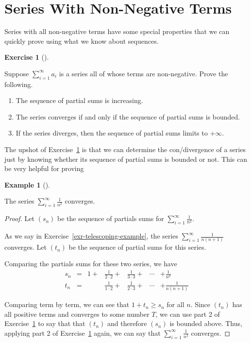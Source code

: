 \documentclass[
  letterpaper,
  DIV=11,
  numbers=noendperiod]{scrreprt}
\providecommand{\tightlist}{%
  \setlength{\itemsep}{0pt}\setlength{\parskip}{0pt}}
\theoremstyle{plain}
\theoremstyle{definition}
\newtheorem{exercise}{Exercise}[chapter]
\theoremstyle{plain}
\theoremstyle{plain}
\theoremstyle{definition}
\newtheorem{example}{Example}[chapter]
\theoremstyle{definition}
\theoremstyle{remark}
\begin{document}
\section{Series With Non-Negative
Terms}\label{series-with-non-negative-terms}

Series with all non-negative terms have some special properties that we
can quickly prove using what we know about sequences.

\begin{exercise}[]\protect\hypertarget{exr-positive-terms}{}\label{exr-positive-terms}

Suppose \(\displaystyle \sum_{i=1}^\infty a_i\) is a series all of whose
terms are non-negative. Prove the following.

\begin{enumerate}
\def\labelenumi{\arabic{enumi}.}
\tightlist
\item
  The sequence of partial sums is increasing.
\item
  The series converges if and only if the sequence of partial sums is
  bounded.
\item
  If the series diverges, then the sequence of partial sums limits to
  \(+\infty\).
\end{enumerate}

\end{exercise}

The upshot of Exercise~\ref{exr-positive-terms} is that we can determine
the con/divergence of a series just by knowing whether its sequence of
partial sums is bounded or not. This can be very helpful for proving

\begin{example}[]\protect\hypertarget{exm-basel-series}{}\label{exm-basel-series}

The series \(\displaystyle\sum_{i=1}^\infty \frac{1}{n^2}\) converges.

\end{example}

\begin{proof}
Let \((s_n)\) be the sequence of partials sums for
\(\displaystyle\sum_{i=1}^\infty \frac{1}{n^2}\).

As we say in Exercise~\ref{exr-telescoping-example}, the series
\(\displaystyle\sum_{i=1}^\infty \frac{1}{n(n+1)}\) converges. Let
\((t_n)\) be the sequence of partial sums for this series.

Comparing the partials sums for these two series, we have
\[\begin{array}{ccccccc}
s_n&=&1+&\frac{1}{2\cdot2}+&\frac{1}{3\cdot3}+&\cdots&+\frac{1}{n^2}\\
t_n&=&&\frac{1}{1\cdot2}+&\frac{1}{2\cdot3}+&\cdots&+\frac{1}{n(n+1)}
\end{array}\]

Comparing term by term, we can see that \(1+t_n\geq s_n\) for all \(n\).
Since \((t_n)\) has all positive terms and converges to some number
\(T\), we can use part 2 of Exercise~\ref{exr-positive-terms} to say
that that \((t_n)\) and therefore \((s_n)\) is bounded above. Thus,
applying part 2 of Exercise~\ref{exr-positive-terms} again, we can say
that \(\displaystyle\sum_{i=1}^\infty \frac{1}{n^2}\) converges.
\end{proof}
\end{document}
